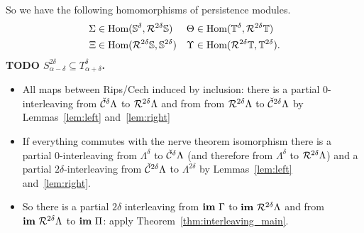 So we have the following homomorphisms of persistence modules.
\begin{align*}
  \Sigma&\in\text{Hom}(\mathbb{S}^\delta, \mathcal{R}^{2\delta}\mathbb{S}) & \Theta&\in\text{Hom}(\mathbb{T}^\delta,\mathcal{R}^{2\delta}\mathbb{T})\\
  \Xi&\in\text{Hom}(\mathcal{R}^{2\delta}\mathbb{S}, \mathbb{S}^{2\delta}) & \Upsilon&\in\text{Hom}(\mathcal{R}^{2\delta}\mathbb{T}, \mathbb{T}^{2\delta}).
\end{align*}
\textbf{TODO $S^{2\delta}_{\alpha-\delta}\subseteq T^\delta_{\alpha+\delta}$.}

\begin{itemize}
  \item All maps between Rips/Cech induced by inclusion: there is a partial 0-interleaving from $\check{\mathcal{C}}^\delta\Lambda$ to $\mathcal{R}^{2\delta}\Lambda$ and from from $\mathcal{R}^{2\delta}\Lambda$ to $\check{\mathcal{C}}^{2\delta}\Lambda$ by Lemmas~\ref{lem:left} and~\ref{lem:right}
  \item If everything commutes with the nerve theorem isomorphism there is a partial 0-interleaving from $\Lambda^\delta$ to $\check{\mathcal{C}}^\delta\Lambda$ (and therefore from $\Lambda^\delta$ to $\mathcal{R}^{2\delta}\Lambda$) and a partial $2\delta$-interleaving from $\check{\mathcal{C}}^{2\delta}\Lambda$ to $\Lambda^{2\delta}$ by Lemmas~\ref{lem:left} and~\ref{lem:right}.
  \item So there is a partial $2\delta$ interleaving from $\mathbf{im}~\Gamma$ to $\mathbf{im}~\mathcal{R}^{2\delta}\Lambda$ and from $\mathbf{im}~\mathcal{R}^{2\delta}\Lambda$ to $\mathbf{im}~\Pi$: apply Theorem~\ref{thm:interleaving_main}.
\end{itemize}

